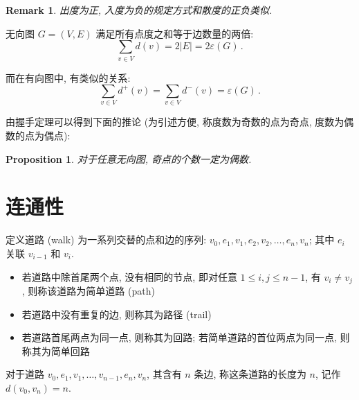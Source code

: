 \documentclass[UTF8]{ctexart}
\theoremstyle{mystyle}
\newtheorem{proposition}{Proposition}[section]
\theoremstyle{myremark}
\newtheorem*{remark}{Remark}
\theoremstyle{plain}
\begin{document}
\begin{remark}
    出度为正, 入度为负的规定方式和散度的正负类似.
\end{remark}

\begin{theorem}
    无向图 $ G = (V, E) $ 满足所有点度之和等于边数量的两倍:
    \[ \sum_{v \in V} d (v) = 2 |E| = 2 \varepsilon(G) \,.\]

    而在有向图中, 有类似的关系:
    \[ \sum_{v \in V} d^+(v) = \sum_{v \in V} d^-(v) =  \varepsilon(G) \,.\]
\end{theorem}

由握手定理可以得到下面的推论 (为引述方便, 称度数为奇数的点为奇点, 度数为偶数的点为偶点):
\begin{proposition}
    对于任意无向图, 奇点的个数一定为偶数.
\end{proposition}



\section{连通性}
\begin{definition}
    定义道路 (walk) 为一系列交替的点和边的序列: $ v_0, e_1, v_1, e_2, v_2, \dots, e_n, v_n $; 其中 $ e_i $ 关联 $ v_{i - 1} $ 和 $ v_i $. 
    \begin{itemize}
        \item 若道路中除首尾两个点, 没有相同的节点, 即对任意 $ 1 \leqslant i, j \leqslant n - 1 $, 有 $ v_i \neq v_j $, 则称该道路为简单道路 (path)
        \item 若道路中没有重复的边, 则称其为路径 (trail)
        \item 若道路首尾两点为同一点, 则称其为回路; 若简单道路的首位两点为同一点, 则称其为简单回路
    \end{itemize}
\end{definition}

对于道路 $ v_0, e_1, v_1, \dots, v_{n - 1}, e_n, v_n $, 其含有 $ n $ 条边, 称这条道路的长度为 $ n $, 记作 $ d(v_0, v_n) = n $.
\end{document}
